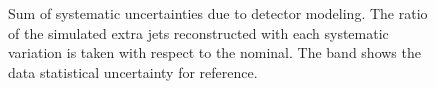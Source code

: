 \begin{figure}
~
 \\
~
~
~
\caption{Sum of systematic uncertainties due to detector modeling. The ratio of the simulated extra jets reconstructed with each systematic variation is taken with respect to the nominal. The band shows the data statistical uncertainty for reference.}
\label{fig:SmoothSys}
\end{figure}
